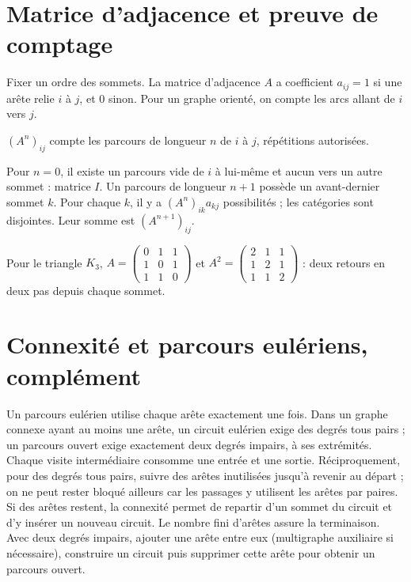 \documentclass[../cours_tle.tex]{subfiles}
\begin{document}
\section{Matrice d'adjacence et preuve de comptage}
Fixer un ordre des sommets. La matrice d'adjacence $A$ a coefficient $a_{ij}=1$ si une arête relie $i$ à $j$, et $0$ sinon. Pour un graphe orienté, on compte les arcs allant de $i$ vers $j$.
\begin{theoreme}
$(A^n)_{ij}$ compte les parcours de longueur $n$ de $i$ à $j$, répétitions autorisées.
\end{theoreme}
\begin{demonstration}
Pour $n=0$, il existe un parcours vide de $i$ à lui-même et aucun vers un autre sommet : matrice $I$.
Un parcours de longueur $n+1$ possède un avant-dernier sommet $k$. Pour chaque $k$, il y a $(A^n)_{ik}a_{kj}$ possibilités ; les catégories sont disjointes. Leur somme est $(A^{n+1})_{ij}$.
\end{demonstration}
Pour le triangle $K_3$, $A=\begin{pmatrix}0&1&1\\1&0&1\\1&1&0\end{pmatrix}$ et
$A^2=\begin{pmatrix}2&1&1\\1&2&1\\1&1&2\end{pmatrix}$ : deux retours en deux pas depuis chaque sommet.
\section{Connexité et parcours eulériens, complément}
Un parcours eulérien utilise chaque arête exactement une fois. Dans un graphe connexe ayant au moins une arête, un circuit eulérien exige des degrés tous pairs ; un parcours ouvert exige exactement deux degrés impairs, à ses extrémités. Chaque visite intermédiaire consomme une entrée et une sortie.
Réciproquement, pour des degrés tous pairs, suivre des arêtes inutilisées jusqu'à revenir au départ ; on ne peut rester bloqué ailleurs car les passages y utilisent les arêtes par paires. Si des arêtes restent, la connexité permet de repartir d'un sommet du circuit et d'y insérer un nouveau circuit. Le nombre fini d'arêtes assure la terminaison.
Avec deux degrés impairs, ajouter une arête entre eux (multigraphe auxiliaire si nécessaire), construire un circuit puis supprimer cette arête pour obtenir un parcours ouvert.
\end{document}
